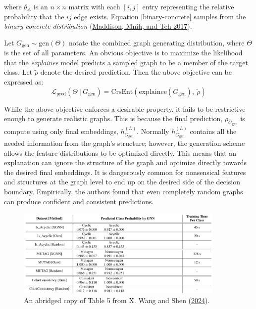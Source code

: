 \documentclass[
  11pt,
  letterpaper,
]{article}
\begin{document}
where \(\theta_A\) is an \(n \times n\) matrix with each \([i, j]\)
entry representing the relative probability that the \(ij\) edge exists.
Equation \ref{binary-concrete} samples from the \emph{binary concrete
distribution} (\protect\hyperlink{ref-Maddison_Mnih_Teh_2017}{Maddison,
Mnih, and Teh 2017}).

\quad Let \(G_{\text{gen}} \sim \text{gen}(\Theta)\) notate the combined
graph generating distribution, where \(\Theta\) is the set of all
parameters. An obvious objective is to maximize the likelihood that the
\emph{explainee} model predicts a sampled graph to be a member of the
target class. Let \(\tilde{\rho}\) denote the desired prediction. Then
the above objective can be expressed as: \begin{equation} \label{l-pred}
    \mathcal{L}_\text{pred} (\Theta \ | \ G_\text{gen}) = \text{CrsEnt} (\text{explainee}(G_\text{gen}), \ \tilde{\rho})
\end{equation}

While the above objective enforces a desirable property, it fails to be
restrictive enough to generate realistic graphs. This is because the
final prediction, \(\rho_{G_{\text{gen}}}\) is compute using only final
embeddings, \(h^{(L)}_{G_{\text{gen}}}\). Normally
\(h^{(L)}_{G_{\text{gen}}}\) contains all the needed information from
the graph's structure; however, the generation scheme allows the feature
distributions to be optimized directly. This means that an explanation
can ignore the structure of the graph and optimize directly towards the
desired final embeddings. It is dangerously common for nonsensical
features and structures at the graph level to end up on the desired side
of the decision boundary. Empirically, the authors found that even
completely random graphs can produce confident and consistent
predictions.

\begin{figure}

{\centering \includegraphics[width=0.9\textwidth,height=\textheight]{figures/random_baseline.png}

}

\caption{\label{fig-random-baseline}An abridged copy of Table 5 from X.
Wang and Shen (\protect\hyperlink{ref-Wang_Shen_2024}{2024}).}

\end{figure}
\end{document}
